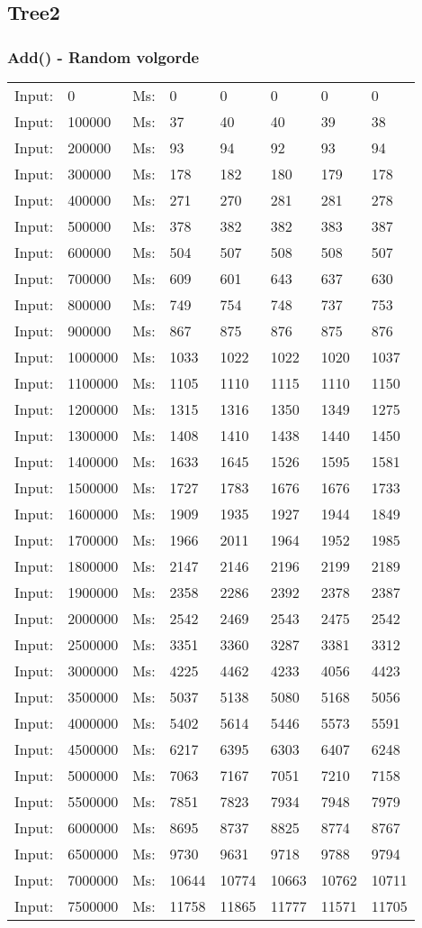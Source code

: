 \documentclass[11pt,a4paper]{report}
\begin{document}
\begin{tiny}
\subsection*{Tree2}
\subsubsection*{Add() - Random volgorde}
\begin{tabular}{l l ||l  l  l  l  l  l}
Input:&0&Ms:&0&0&0&0&0\\
Input:&100000&Ms:&37&40&40&39&38\\
Input:&200000&Ms:&93&94&92&93&94\\
Input:&300000&Ms:&178&182&180&179&178\\
Input:&400000&Ms:&271&270&281&281&278\\
Input:&500000&Ms:&378&382&382&383&387\\
Input:&600000&Ms:&504&507&508&508&507\\
Input:&700000&Ms:&609&601&643&637&630\\
Input:&800000&Ms:&749&754&748&737&753\\
Input:&900000&Ms:&867&875&876&875&876\\
Input:&1000000&Ms:&1033&1022&1022&1020&1037\\
Input:&1100000&Ms:&1105&1110&1115&1110&1150\\
Input:&1200000&Ms:&1315&1316&1350&1349&1275\\
Input:&1300000&Ms:&1408&1410&1438&1440&1450\\
Input:&1400000&Ms:&1633&1645&1526&1595&1581\\
Input:&1500000&Ms:&1727&1783&1676&1676&1733\\
Input:&1600000&Ms:&1909&1935&1927&1944&1849\\
Input:&1700000&Ms:&1966&2011&1964&1952&1985\\
Input:&1800000&Ms:&2147&2146&2196&2199&2189\\
Input:&1900000&Ms:&2358&2286&2392&2378&2387\\
Input:&2000000&Ms:&2542&2469&2543&2475&2542\\
Input:&2500000&Ms:&3351&3360&3287&3381&3312\\
Input:&3000000&Ms:&4225&4462&4233&4056&4423\\
Input:&3500000&Ms:&5037&5138&5080&5168&5056\\
Input:&4000000&Ms:&5402&5614&5446&5573&5591\\
Input:&4500000&Ms:&6217&6395&6303&6407&6248\\
Input:&5000000&Ms:&7063&7167&7051&7210&7158\\
Input:&5500000&Ms:&7851&7823&7934&7948&7979\\
Input:&6000000&Ms:&8695&8737&8825&8774&8767\\
Input:&6500000&Ms:&9730&9631&9718&9788&9794\\
Input:&7000000&Ms:&10644&10774&10663&10762&10711\\
Input:&7500000&Ms:&11758&11865&11777&11571&11705\\
\end{tabular}


\end{tiny}
\end{document}
